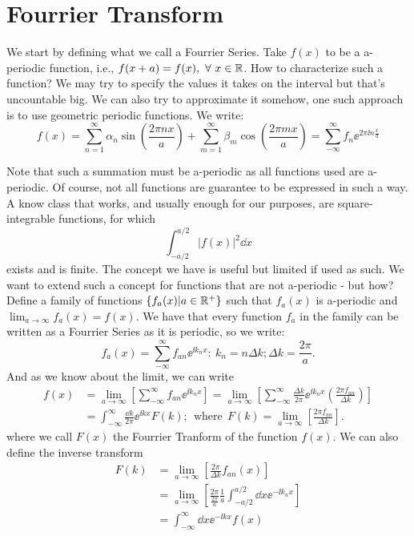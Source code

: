 \section{Fourrier Transform}

We start by defining what we call a Fourrier Series. Take $f(x)$ to be a a-periodic function, i.e., $f(x+a) = f(x), \ \forall \ x \in \mathbb{R}$. How to characterize such a function? We may try to specify the values it takes on the interval but that's uncountable big. We can also try to approximate it somehow, one such approach is to use geometric periodic functions. We write:
$$
f(x) = \sum_{n=1}^{\infty} \alpha_n \sin\left( \frac{2\pi n x}{a}\right) + \sum_{m=1}^{\infty} \beta_m \cos\left( \frac{2\pi m x}{a}\right) = \sum_{-\infty}^{\infty} f_n \ee^{2 \pi \ii n \frac{x}{a}}
$$

Note that such a summation must be a-periodic as all functions used are a-periodic. Of course, not all functions are guarantee to be expressed in such a way. A know class that works, and usually enough for our purposes, are square-integrable functions, for which
$$
\int_{-a/2}^{a/2} |f(x)|^2 \dd x
$$
exists and is finite. The concept we have is useful but limited if used as such. We want to extend such a concept for functions that are not a-periodic - but how? Define a family of functions $\{f_a(x) | a \in \mathbb{R}^+\}$  such that $f_a(x)$ is a-periodic and $ \lim_{a \rightarrow \infty}f_a(x) = f(x)$. We have that every function $f_{a}$ in the family can be written as a Fourrier Series as it is periodic, so we write:
$$
f_a(x) = \sum_{-\infty}^{\infty} f_{an} \ee^{\ii k_n x}: \ k_n = n \Delta k; \Delta k = \frac{2\pi}{a}.
$$
And as we know about the limit, we can write
\begin{equation}
	\begin{split}
		f(x) & = \lim_{a \rightarrow \infty} \left[ \sum_{-\infty}^{\infty} f_{an} \ee^{\ii k_n x} \right] = \lim_{a \rightarrow \infty} \left[ \sum_{-\infty}^{\infty} \frac{\Delta k}{2\pi} \ee^{\ii k_n x} \left( \frac{2\pi f_{an}}{\Delta k}\right) \right] \\
		& = \int_{-\infty}^{\infty} \frac{\dd k}{2\pi} \ee^{\ii k x} F(k); \ \ \text{where} \ \ F(k) = \lim_{a \rightarrow \infty} \left[ \frac{2\pi f_{an}}{\Delta k} \right].
	\end{split} 
\end{equation}
where we call $F(x)$ the Fourrier Tranform of the function $f(x)$. We can also define the inverse transform 
\begin{equation}
	\begin{split}
		F(k) & = \lim_{a \rightarrow \infty} \left[ \frac{2\pi}{\Delta k} f_{an}(x) \right] \\
		& = \lim_{a \rightarrow \infty} \left[ \frac{2\pi}{\frac{2\pi}{a}} \frac{1}{a} \int_{-a/2}^{a/2} \dd x \ee^{- \ii k_n x} \right] \\
		& = \int_{-\infty}^{\infty} \dd x \ee^{- \ii k x} f(x)
	\end{split} 
\end{equation}

